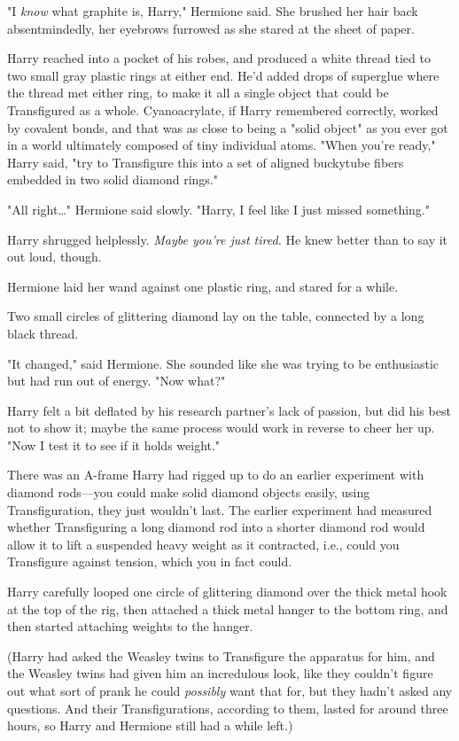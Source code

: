"I \emph{know} what graphite is, Harry," Hermione said. She brushed her hair 
back absentmindedly, her eyebrows furrowed as she stared at the sheet of paper.

Harry reached into a pocket of his robes, and produced a white thread tied to 
two small gray plastic rings at either end. He'd added drops of superglue where 
the thread met either ring, to make it all a single object that could be 
Transfigured as a whole. Cyanoacrylate, if Harry remembered correctly, worked 
by covalent bonds, and that was as close to being a "solid object" as you ever 
got in a world ultimately composed of tiny individual atoms. "When you're 
ready," Harry said, "try to Transfigure this into a set of aligned buckytube 
fibers embedded in two solid diamond rings."

"All right{\ldots}" Hermione said slowly. "Harry, I feel like I just missed 
something."

Harry shrugged helplessly. \emph{Maybe you're just tired.} He knew better than 
to say it out loud, though.

Hermione laid her wand against one plastic ring, and stared for a while.

Two small circles of glittering diamond lay on the table, connected by a long 
black thread.

"It changed," said Hermione. She sounded like she was trying to be enthusiastic 
but had run out of energy. "Now what?"

Harry felt a bit deflated by his research partner's lack of passion, but did 
his best not to show it; maybe the same process would work in reverse to cheer 
her up. "Now I test it to see if it holds weight."

There was an A-frame Harry had rigged up to do an earlier experiment with 
diamond rods---you could make solid diamond objects easily, using 
Transfiguration, they just wouldn't last. The earlier experiment had measured 
whether Transfiguring a long diamond rod into a shorter diamond rod would allow 
it to lift a suspended heavy weight as it contracted, i.e., could you 
Transfigure against tension, which you in fact could.

Harry carefully looped one circle of glittering diamond over the thick metal 
hook at the top of the rig, then attached a thick metal hanger to the bottom 
ring, and then started attaching weights to the hanger.

(Harry had asked the Weasley twins to Transfigure the apparatus for him, and 
the Weasley twins had given him an incredulous look, like they couldn't figure 
out what sort of prank he could \emph{possibly} want that for, but they hadn't 
asked any questions. And their Transfigurations, according to them, lasted for 
around three hours, so Harry and Hermione still had a while left.)

